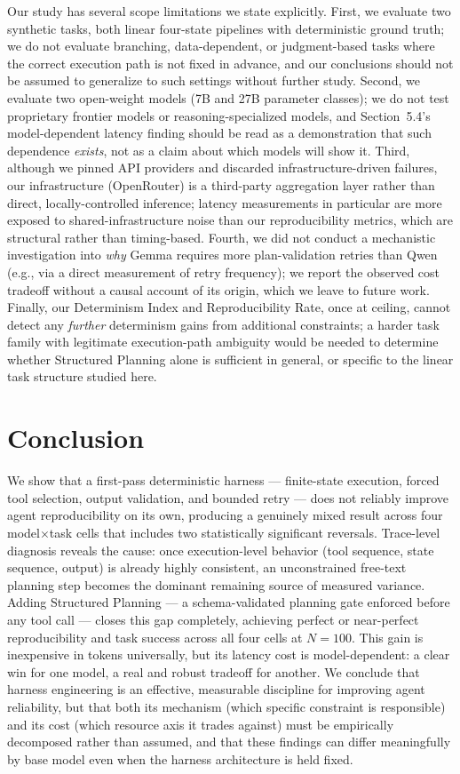 \documentclass[11pt]{article}
\begin{document}
Our study has several scope limitations we state explicitly. First, we evaluate two synthetic tasks, both linear four-state pipelines with deterministic ground truth; we do not evaluate branching, data-dependent, or judgment-based tasks where the correct execution path is not fixed in advance, and our conclusions should not be assumed to generalize to such settings without further study. Second, we evaluate two open-weight models (7B and 27B parameter classes); we do not test proprietary frontier models or reasoning-specialized models, and Section~5.4's model-dependent latency finding should be read as a demonstration that such dependence \emph{exists}, not as a claim about which models will show it. Third, although we pinned API providers and discarded infrastructure-driven failures, our infrastructure (OpenRouter) is a third-party aggregation layer rather than direct, locally-controlled inference; latency measurements in particular are more exposed to shared-infrastructure noise than our reproducibility metrics, which are structural rather than timing-based. Fourth, we did not conduct a mechanistic investigation into \emph{why} Gemma requires more plan-validation retries than Qwen (e.g., via a direct measurement of retry frequency); we report the observed cost tradeoff without a causal account of its origin, which we leave to future work. Finally, our Determinism Index and Reproducibility Rate, once at ceiling, cannot detect any \emph{further} determinism gains from additional constraints; a harder task family with legitimate execution-path ambiguity would be needed to determine whether Structured Planning alone is sufficient in general, or specific to the linear task structure studied here.

\section{Conclusion}

We show that a first-pass deterministic harness --- finite-state execution, forced tool selection, output validation, and bounded retry --- does not reliably improve agent reproducibility on its own, producing a genuinely mixed result across four model$\times$task cells that includes two statistically significant reversals. Trace-level diagnosis reveals the cause: once execution-level behavior (tool sequence, state sequence, output) is already highly consistent, an unconstrained free-text planning step becomes the dominant remaining source of measured variance. Adding Structured Planning --- a schema-validated planning gate enforced before any tool call --- closes this gap completely, achieving perfect or near-perfect reproducibility and task success across all four cells at $N=100$. This gain is inexpensive in tokens universally, but its latency cost is model-dependent: a clear win for one model, a real and robust tradeoff for another. We conclude that harness engineering is an effective, measurable discipline for improving agent reliability, but that both its mechanism (which specific constraint is responsible) and its cost (which resource axis it trades against) must be empirically decomposed rather than assumed, and that these findings can differ meaningfully by base model even when the harness architecture is held fixed.
\end{document}
